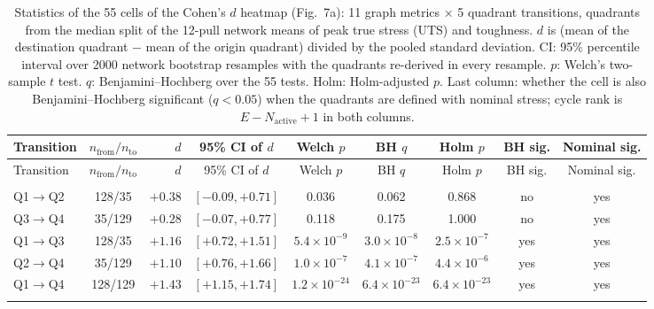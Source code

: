 \begingroup\footnotesize\setlength{\tabcolsep}{4pt}
\begin{longtable}{lcrcccccc}
\caption{Statistics of the 55 cells of the Cohen's $d$ heatmap (Fig.~7a): 11 graph metrics $\times$ 5 quadrant transitions, quadrants from the median split of the 12-pull network means of peak true stress (UTS) and toughness. $d$ is (mean of the destination quadrant $-$ mean of the origin quadrant) divided by the pooled standard deviation. CI: 95\% percentile interval over 2000 network bootstrap resamples with the quadrants re-derived in every resample. $p$: Welch's two-sample $t$ test. $q$: Benjamini--Hochberg over the 55 tests. Holm: Holm-adjusted $p$. Last column: whether the cell is also Benjamini--Hochberg significant ($q<0.05$) when the quadrants are defined with nominal stress; cycle rank is $E-N_\mathrm{active}+1$ in both columns.}\label{tab:cells}\\
\toprule
Transition & $n_\mathrm{from}/n_\mathrm{to}$ & $d$ & 95\% CI of $d$ & Welch $p$ & BH $q$ & Holm $p$ & BH sig. & Nominal sig. \\
\midrule
\endfirsthead
\toprule
Transition & $n_\mathrm{from}/n_\mathrm{to}$ & $d$ & 95\% CI of $d$ & Welch $p$ & BH $q$ & Holm $p$ & BH sig. & Nominal sig. \\
\midrule
\endhead
\bottomrule
\endfoot
\multicolumn{9}{l}{\textbf{Algebraic connectivity ($\lambda_2$)}} \\*
\quad Q1$\to$Q2 & 128/35 & $+0.38$ & $[-0.09, +0.71]$ & 0.036 & 0.062 & 0.868 & no & yes \\
\quad Q3$\to$Q4 & 35/129 & $+0.28$ & $[-0.07, +0.77]$ & 0.118 & 0.175 & 1.000 & no & yes \\
\quad Q1$\to$Q3 & 128/35 & $+1.16$ & $[+0.72, +1.51]$ & $5.4\times10^{-9}$ & $3.0\times10^{-8}$ & $2.5\times10^{-7}$ & yes & yes \\
\quad Q2$\to$Q4 & 35/129 & $+1.10$ & $[+0.76, +1.66]$ & $1.0\times10^{-7}$ & $4.1\times10^{-7}$ & $4.4\times10^{-6}$ & yes & yes \\
\quad Q1$\to$Q4 & 128/129 & $+1.43$ & $[+1.15, +1.74]$ & $1.2\times10^{-24}$ & $6.4\times10^{-23}$ & $6.4\times10^{-23}$ & yes & yes \\
\addlinespace[3pt]
\multicolumn{9}{l}{\textbf{Alg.\ conn.\ excl.\ dangling ends ($\lambda_{2,\mathrm{core}}$)}} \\*

\end{longtable}
